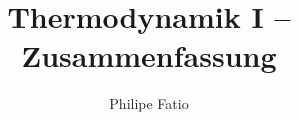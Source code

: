 \documentclass[9pt,fleqn,ngerman,article]{memoir}
\title{Thermodynamik I -- Zusammenfassung}
\author{Philipe Fatio}
\begin{document}
	\begin{multicols*}{3}
	\end{multicols*}
\end{document}
